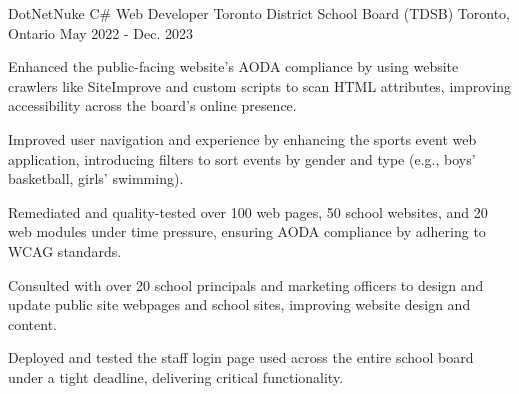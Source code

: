 \begin{cventries}
\cventry
  {DotNetNuke C\# Web Developer} %
  {Toronto District School Board (TDSB)} %
  {Toronto, Ontario} %
  {May 2022 - Dec. 2023} %
  {
    \begin{cvitems} %
      \item {Enhanced the public-facing website's AODA compliance by using website crawlers like SiteImprove and custom scripts to scan HTML attributes, improving accessibility across the board's online presence.}
      \item {Improved user navigation and experience by enhancing the sports event web application, introducing filters to sort events by gender and type (e.g., boys' basketball, girls' swimming).}
      \item {Remediated and quality-tested over 100 web pages, 50 school websites, and 20 web modules under time pressure, ensuring AODA compliance by adhering to WCAG standards.}
      \item {Consulted with over 20 school principals and marketing officers to design and update public site webpages and school sites, improving website design and content.}
      \item {Deployed and tested the staff login page used across the entire school board under a tight deadline, delivering critical functionality.}
    \end{cvitems}
  }


\end{cventries}
